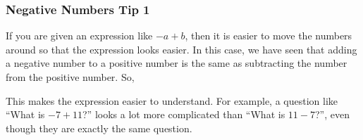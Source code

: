             \subsubsection{ Negative Numbers Tip 1}
            \nopagebreak
          \label{m38346*id174809}If you are given an expression like $-a+b$, then it is easier to move the numbers
around so that the expression looks easier. In this case, we have seen that
adding a negative number to a positive number is the same as subtracting the
number from the positive number. So,\par 
          \label{m38346*uid28}\nopagebreak\noindent{}
          \label{m38346*id174945}This makes the expression easier to understand. For example, a question like ``What
is $-7+11$?'' looks a lot more complicated than ``What is $11-7$?'', even though
they are exactly the same question.\par 
        \label{m38346*uid29}
